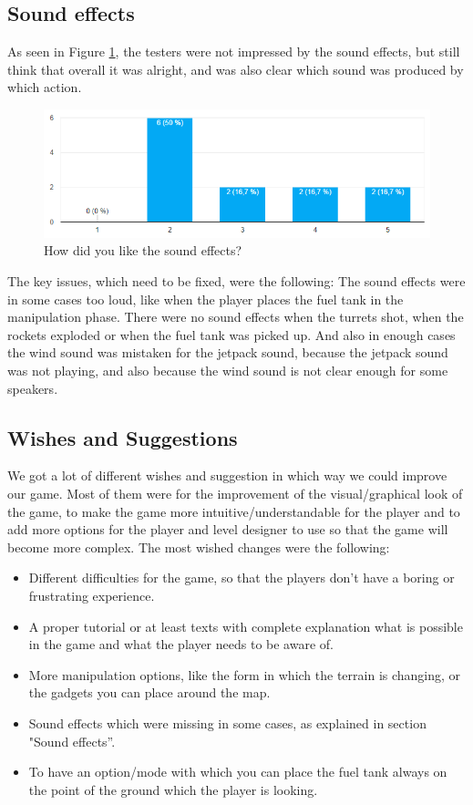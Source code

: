 \documentclass[12pt, letterpaper]{scrartcl}
\begin{document}
	 \subsection{Sound effects}
	 As seen in Figure \ref{fig:sound}, the testers were not impressed by the sound effects, but still think that overall it was alright, and was also clear which sound was produced by which action.
	 
	 \begin{figure}[H]
	 	\centering
	 	\includegraphics[width=\textwidth]{images/playtesting/sound}
	 	\caption{How did you like the sound effects?}
	 	\label{fig:sound}
	 \end{figure}
	 
	 The key issues, which need to be fixed, were the following: The sound effects were in some cases too loud, like when the player places the fuel tank in the manipulation phase. There were no sound effects when the turrets shot, when the rockets exploded or when the fuel tank was picked up. And also in enough cases the wind sound was mistaken for the jetpack sound, because the jetpack sound was not playing, and also because the wind sound is not clear enough for some speakers.
	 
	 \subsection{Wishes and Suggestions}
	 We got a lot of different wishes and suggestion in which way we could improve our game. Most of them were for the improvement of the visual/graphical look of the game, to make the game more intuitive/understandable for the player and to add more options for the player and level designer to use so that the game will become more complex.
	 \bigbreak
	 The most wished changes were the following:
	 \begin{itemize}
	 \item Different difficulties for the game, so that the players don't have a boring or frustrating experience.	
	 \item A proper tutorial or at least texts with complete explanation what is possible in the game and what the player needs to be aware of.
	 \item More manipulation options, like the form in which the terrain is changing, or the gadgets you can place around the map.
	 \item Sound effects which were missing in some cases, as explained in section "Sound effects”.
	 \item To have an option/mode with which you can place the fuel tank always on the point of the ground which the player is looking.
	 \end{itemize}
	 
	 
\end{document}
